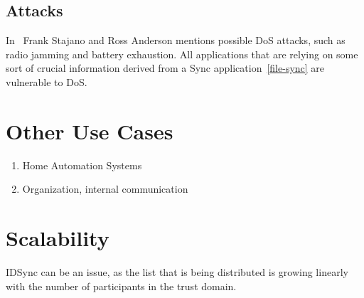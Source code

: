 \subsection{Attacks}
In~\cite{DBLP:conf/spw/StajanoA99} Frank Stajano and Ross Anderson mentions possible \gls{DoS} attacks, such as radio jamming and battery exhaustion. 
All applications that are relying on some sort of crucial information derived from a Sync application~\autoref{file-sync} are vulnerable to \gls{DoS}.

\section{Other Use Cases}

\begin{enumerate}
	\item Home Automation Systems
	\item Organization, internal communication
\end{enumerate}

\section{Scalability}
IDSync can be an issue, as the list that is being distributed is growing linearly with the number of participants in the trust domain.